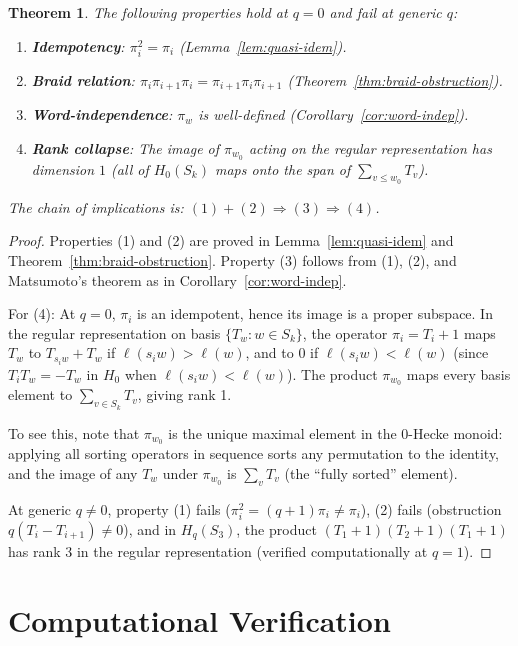 \documentclass[11pt]{article}
\newtheorem{theorem}{Theorem}
\theoremstyle{definition}
\theoremstyle{remark}
\begin{document}
\begin{theorem}\label{thm:why-q0}
The following properties hold at $q = 0$ and fail at generic $q$:
\begin{enumerate}
\item \textbf{Idempotency}: $\pi_i^2 = \pi_i$ (Lemma~\ref{lem:quasi-idem}).
\item \textbf{Braid relation}: $\pi_i\pi_{i+1}\pi_i = \pi_{i+1}\pi_i\pi_{i+1}$
  (Theorem~\ref{thm:braid-obstruction}).
\item \textbf{Word-independence}: $\pi_w$ is well-defined
  (Corollary~\ref{cor:word-indep}).
\item \textbf{Rank collapse}: The image of $\pi_{w_0}$ acting on the
  regular representation has dimension $1$ (all of $H_0(S_k)$ maps onto
  the span of $\sum_{v \leq w_0} T_v$).
\end{enumerate}
The chain of implications is: $(1) + (2) \Rightarrow (3) \Rightarrow (4)$.
\end{theorem}

\begin{proof}
Properties (1) and (2) are proved in Lemma~\ref{lem:quasi-idem} and
Theorem~\ref{thm:braid-obstruction}. Property (3) follows from (1), (2),
and Matsumoto's theorem as in Corollary~\ref{cor:word-indep}.

For (4): At $q = 0$, $\pi_i$ is an idempotent, hence its image is a proper
subspace. In the regular representation on basis $\{T_w : w \in S_k\}$, the
operator $\pi_i = T_i + 1$ maps $T_w$ to $T_{s_iw} + T_w$ if $\ell(s_iw) > \ell(w)$,
and to $0$ if $\ell(s_iw) < \ell(w)$ (since $T_i T_w = -T_w$ in $H_0$ when
$\ell(s_iw) < \ell(w)$). The product $\pi_{w_0}$ maps every basis element
to $\sum_{v \in S_k} T_v$, giving rank 1.

To see this, note that $\pi_{w_0}$ is the unique maximal element in the
$0$-Hecke monoid: applying all sorting operators in sequence sorts any
permutation to the identity, and the image of any $T_w$ under $\pi_{w_0}$
is $\sum_{v} T_v$ (the ``fully sorted'' element).

At generic $q \neq 0$, property (1) fails ($\pi_i^2 = (q+1)\pi_i \neq \pi_i$),
(2) fails (obstruction $q(T_i - T_{i+1}) \neq 0$), and in $H_q(S_3)$,
the product $(T_1+1)(T_2+1)(T_1+1)$ has rank 3 in the regular representation
(verified computationally at $q = 1$).
\end{proof}

\section{Computational Verification}
\end{document}

